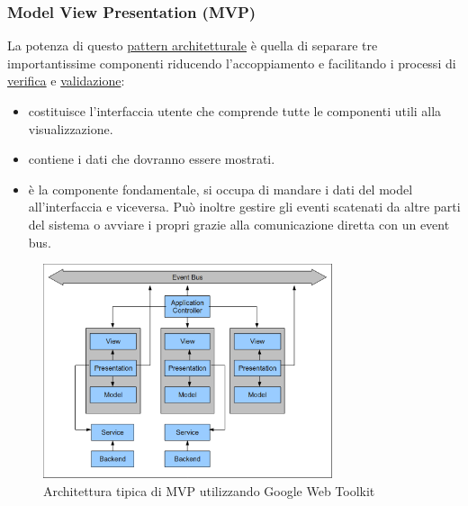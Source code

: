 \newpage
\subsubsection{Model View Presentation (MVP) }
La potenza di questo \underline{pattern architetturale} \`e quella di separare
tre importantissime componenti riducendo l'accoppiamento e facilitando i processi di
\underline{verifica} e \underline{validazione}:
\begin{itemize}
  \item{ }
  costituisce l'interfaccia utente che comprende tutte le componenti utili alla
  visualizzazione.
  \item{ }
  contiene i dati che dovranno essere mostrati. 
  \item{ }
  \`e la componente fondamentale, si occupa di mandare i dati del model
  all'interfaccia e viceversa. Pu\`o inoltre gestire gli eventi scatenati da
  altre parti del sistema o avviare i propri grazie alla comunicazione diretta
  con un event bus.

\end{itemize}    
\begin{figure}[!h]
\centering
\includegraphics[width=8.5cm]{img/ST/mvp.png}
\caption{Architettura tipica di MVP utilizzando Google Web Toolkit}
\end{figure}

